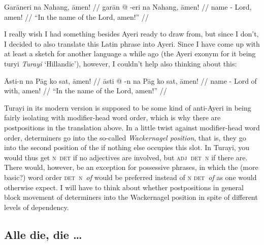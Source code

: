 \documentclass[12pt,paper=a4]{scrartcl}
\newcommand{\fw}[1]{\textit{#1}} %
\newcommand{\xayr}[3]{{\Tagati #1} \emph{#2} \enquote*{#3}}
\begin{document}

\ex \label{ex:innomine}
\begingl
	\glpreamble Garāneri na Nahang, āmen! //
	\gla garān @ -eri na Nahang, āmen! //
	\glb name -\Ins{} \Gen{} Lord, amen! //
	\glft \enquote{In the name of the Lord, amen!} //
\endgl \xe

I really wish I had something besides Ayeri ready to draw from, but 
since I don't, I decided to also translate this Latin phrase into Ayeri.
Since I have come up with at least a sketch for another language a while ago 
(the Ayeri exonym for it being \xayr{turyi}{Turayi}{Hillandic}), however, I 
couldn't help also thinking about this:

\ex[exno=\ref{ex:innomine}′] \begingl
	\glpreamble {} Āsti-n na Pāg 
		ko sat, āmen! //
	\gla āsti @ -n na Pāg ko sat, āmen! //
	\glb name -\Def{} \Def{} Lord of with, amen! //
	\glft \enquote{In the name of the Lord, amen!} //
\endgl
\xe

Turayi in its modern version is supposed to be some kind of anti-Ayeri in being 
fairly isolating with modifier-head word order, which is why there are 
postpositions in the translation above. In a little twist against modifier-head
word order, determiners go into the so-called \fw{Wackernagel position}, that 
is, they go into the second position of the \Np{} if nothing else occupies this 
slot. In Turayi, you would thus get \textsc{n}~\textsc{det} if no adjectives are 
involved, but \textsc{adj}~\textsc{det}~\textsc{n} if there are. There would, 
however, be an exception for possessive phrases, in which the (more basic?) word 
order \textsc{det}~\textsc{n}~\emph{of} would be preferred instead of \textsc{n 
det}~\emph{of} as one would otherwise expect. I will have to think about whether 
postpositions in general block movement of determiners into the Wackernagel 
position in spite of different levels of dependency.

\subsection*{Alle die, die …}

\end{document}
